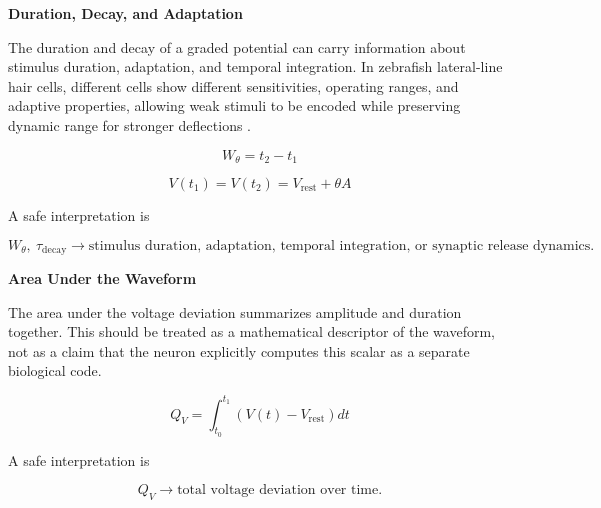 \documentclass{book}
\providecommand{\ProjectDeepHeading}[2]{%
    \par\medskip\noindent\textbf{#2}\par\smallskip
}
\begin{document}
        \ProjectDeepHeading{12}{Duration, Decay, and Adaptation}
            
            The duration and decay of a graded potential can carry information about stimulus duration, adaptation, and temporal integration. In zebrafish lateral-line hair cells, different cells show different sensitivities, operating ranges, and adaptive properties, allowing weak stimuli to be encoded while preserving dynamic range for stronger deflections \citep{pichler-2019-the-transfer-characteristics-of-hair-cells-encoding-mechanical-stimuli-in-the-lateral-line-of-zebrafish}.
            
            \begin{equation}
                W_{\ensuremath{\theta}}
                =
                t_2-t_1
            \end{equation}
            
            \begin{equation}
                V(t_1)
                =
                V(t_2)
                =
                V_{\mathrm{rest}}+\ensuremath{\theta} A
            \end{equation}
            
            A safe interpretation is
            
            \begin{equation}
                W_{\ensuremath{\theta}},\ \ensuremath{\tau}_{\mathrm{decay}}
                \rightarrow
                \text{stimulus duration, adaptation, temporal integration, or synaptic release dynamics}.
            \end{equation}
        
        \ProjectDeepHeading{12}{Area Under the Waveform}
            
            The area under the voltage deviation summarizes amplitude and duration together. This should be treated as a mathematical descriptor of the waveform, not as a claim that the neuron explicitly computes this scalar as a separate biological code.
            
            \begin{equation}
                Q_V
                =
                \int_{t_0}^{t_1}
                \left(V(t)-V_{\mathrm{rest}}\right)
                dt
            \end{equation}
            
            A safe interpretation is
            
            \begin{equation}
                Q_V
                \rightarrow
                \text{total voltage deviation over time}.
            \end{equation}
        
\end{document}
